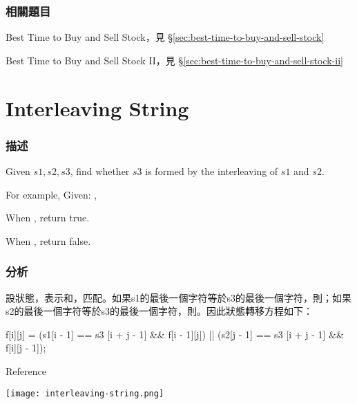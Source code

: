 \subsubsection{相關題目}
\begindot
\item Best Time to Buy and Sell Stock，見 \S \ref{sec:best-time-to-buy-and-sell-stock}
\item Best Time to Buy and Sell Stock II，見 \S \ref{sec:best-time-to-buy-and-sell-stock-ii}
\myenddot


\section{Interleaving String} %
\label{sec:interleaving-string}


\subsubsection{描述}
Given $s1, s2, s3$, find whether $s3$ is formed by the interleaving of $s1$ and $s2$.

For example, Given: ,

When , return true.

When , return false.


\subsubsection{分析}
設狀態，表示和，匹配。如果s1的最後一個字符等於s3的最後一個字符，則；如果s2的最後一個字符等於s3的最後一個字符，則。因此狀態轉移方程如下：
\begin{Code}
f[i][j] = (s1[i - 1] == s3 [i + j - 1] && f[i - 1][j])
       || (s2[j - 1] == s3 [i + j - 1] && f[i][j - 1]);
\end{Code}
Reference 

\begin{center}
\texttt{[image: interleaving-string.png]}\\
\label{fig:interleaving-string}
\end{center}

